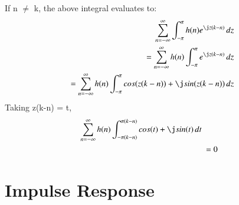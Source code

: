\documentclass[journal,12pt,twocolumn]{IEEEtran}
\begin{document}
If n ${\neq}$ k, the above integral evaluates to:
\begin{align}
	\sum_{n= -{\infty}}^{\infty}\int_{-{\pi}}^{\pi}h(n)e^{{\j z}(k-n)}\,dz\
	\\
	= \sum_{n= -{\infty}}^{\infty}h(n)\int_{-{\pi}}^{\pi}e^{{\j z}(k-n)}\,dz\
	\\
	= \sum_{n= -{\infty}}^{\infty}h(n)\int_{-{\pi}}^{\pi}cos(z(k-n))+{\j}sin(z(k-n))\,dz\
\end{align}
Taking z(k-n) = t,
\begin{align}
	\sum_{n= -{\infty}}^{\infty}h(n)\int_{-{\pi}(k-n)}^{\pi(k-n)}cos(t)+{\j}sin(t)\,dt\
	\\
	&= 0
\end{align}
\section{Impulse Response}
\end{document}
